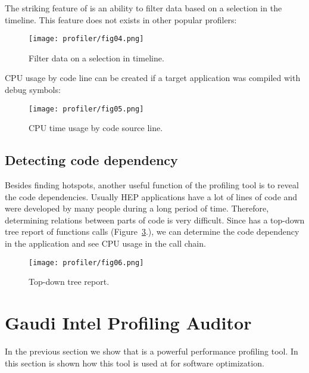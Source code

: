 The striking feature of \amp is an ability to filter data based on a selection
in the timeline. This feature does not exists in other popular profilers:

\begin{figure}[H]
\begin{minipage}{\textwidth}
\texttt{[image: profiler/fig04.png]}
\caption{\label{fig04}Filter data on a selection in timeline.}
\end{minipage}
\end{figure}

CPU usage by code line can be created if a target application was compiled with
debug symbols:

\begin{figure}[H]
\begin{minipage}{\textwidth}
\texttt{[image: profiler/fig05.png]}
\caption{\label{fig05}CPU time usage by code source line.}
\end{minipage}
\end{figure}

\subsection{Detecting code dependency}

Besides finding hotspots, another useful function of the profiling tool is to
reveal the code dependencies. Usually HEP applications have a lot of lines of
code and were developed by many people during a long period of time. Therefore,
determining relations between parts of code is very difficult. Since \amp  has
a top-down tree report of functions calls (Figure~\ref{fig06}.), we can
determine the code dependency in the application and see CPU usage in the call
chain.

\begin{figure}[H]
\begin{minipage}{\textwidth}
\texttt{[image: profiler/fig06.png]}
\caption{\label{fig06}Top-down tree report.}
\end{minipage}
\end{figure}

\section[Profiling Auditor]{Gaudi Intel Profiling Auditor}

In the previous section we show that \iamp is a powerful performance profiling
tool. In this section is shown how this tool is used at \lhcb
for software optimization.

